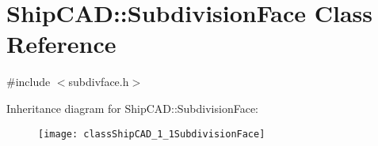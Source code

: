 \hypertarget{classShipCAD_1_1SubdivisionFace}{}\section{Ship\+C\+AD\+:\+:Subdivision\+Face Class Reference}
\label{classShipCAD_1_1SubdivisionFace}


{\ttfamily \#include $<$subdivface.\+h$>$}

Inheritance diagram for Ship\+C\+AD\+:\+:Subdivision\+Face\+:\begin{figure}[H]
\begin{center}
\leavevmode
\texttt{[image: classShipCAD\_1\_1SubdivisionFace]}
\end{center}
\end{figure}
